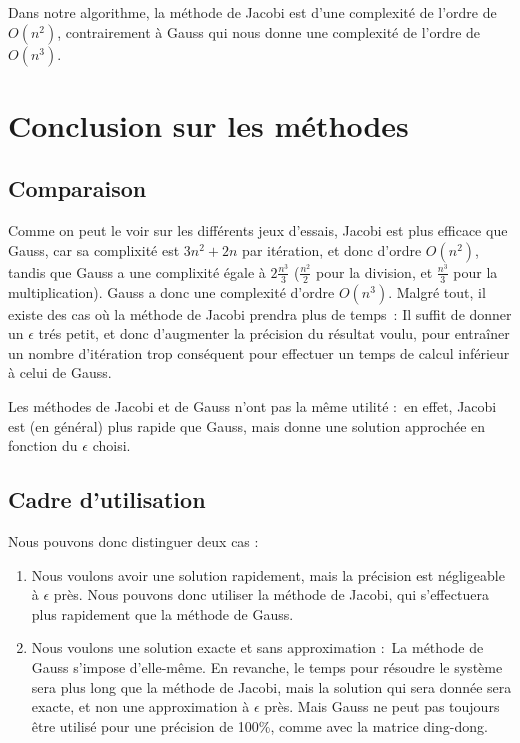 \documentclass[letter]{article}
\begin{document}
Dans notre algorithme, la méthode de Jacobi est d'une complexité de l'ordre de \(O(n^2)\), contrairement à Gauss qui nous donne une complexité de l'ordre de \(O(n^3)\).




\section{Conclusion sur les méthodes}
\label{sec:orgadc0b99}

\subsection{Comparaison}
\label{sec:org7a65f10}
Comme on peut le voir sur les différents jeux d'essais, Jacobi est plus efficace que Gauss, car sa complixité est \(3n^2+2n\) par itération, et donc d'ordre \(O(n^2)\), tandis que Gauss a une complixité égale à \(2\frac{n^3}{3}\) (\(\frac{n^2}{2}\) pour la division, et \(\frac{n^3}{3}\) pour la multiplication).
Gauss a donc une complexité d'ordre \(O(n^3)\).
Malgré tout, il existe des cas où la méthode de Jacobi prendra plus de temps : Il suffit de donner un \(\epsilon\) trés petit, et donc d'augmenter la précision du résultat voulu, pour entraîner un nombre d'itération trop conséquent pour effectuer un temps de calcul inférieur à celui de Gauss.


Les méthodes de Jacobi et de Gauss n'ont pas la même utilité : en effet, Jacobi est (en général) plus rapide que Gauss, mais donne une solution approchée en fonction du \(\epsilon\) choisi.


\subsection{Cadre d'utilisation}
\label{sec:orge281022}

Nous pouvons donc distinguer deux cas :

\begin{enumerate}
\item Nous voulons avoir une solution rapidement, mais la précision est négligeable à \(\epsilon\) près. Nous pouvons donc utiliser la méthode de Jacobi, qui s'effectuera plus rapidement que la méthode de Gauss.
\item Nous voulons une solution exacte et sans approximation : La méthode de Gauss s'impose d'elle-même. En revanche, le temps pour résoudre le système sera plus long que la méthode de Jacobi, mais la solution qui sera donnée sera exacte, et non une approximation à \(\epsilon\) près. Mais Gauss ne peut pas toujours être utilisé pour une précision de 100\%, comme avec la matrice ding-dong.
\end{enumerate}
\end{document}
